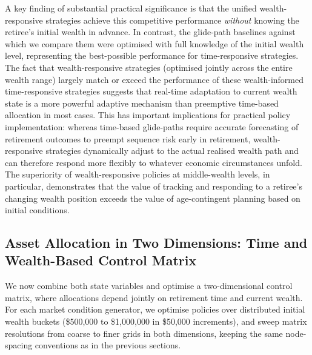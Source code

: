 \documentclass[11pt]{article}
\begin{document}
A key finding of substantial practical significance is that the unified wealth-responsive strategies achieve this competitive performance \textit{without} knowing the retiree's initial wealth in advance. In contrast, the glide-path baselines against which we compare them were optimised with full knowledge of the initial wealth level, representing the best-possible performance for time-responsive strategies. The fact that wealth-responsive strategies (optimised jointly across the entire wealth range) largely match or exceed the performance of these wealth-informed time-responsive strategies suggests that real-time adaptation to current wealth state is a more powerful adaptive mechanism than preemptive time-based allocation in most cases. This has important implications for practical policy implementation: whereas time-based glide-paths require accurate forecasting of retirement outcomes to preempt sequence risk early in retirement, wealth-responsive strategies dynamically adjust to the actual realised wealth path and can therefore respond more flexibly to whatever economic circumstances unfold. The superiority of wealth-responsive policies at middle-wealth levels, in particular, demonstrates that the value of tracking and responding to a retiree's changing wealth position exceeds the value of age-contingent planning based on initial conditions. 

\clearpage

\subsection{Asset Allocation in Two Dimensions: Time and Wealth-Based Control Matrix}
\label{sec:two_dimensional_control_matrix}

We now combine both state variables and optimise a two-dimensional control matrix, where allocations depend jointly on retirement time and current wealth. For each market condition generator, we optimise policies over distributed initial wealth buckets (\$500{,}000 to \$1{,}000{,}000 in \$50{,}000 increments), and sweep matrix resolutions from coarse to finer grids in both dimensions, keeping the same node-spacing conventions as in the previous sections. 
\end{document}
